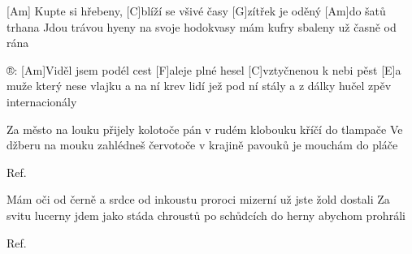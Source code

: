 
[Am] Kupte si hřebeny, [C]blíží se všivé časy	
[G]zítřek je oděný [Am]do šatů trhana
Jdou trávou hyeny na svoje hodokvasy
mám kufry sbaleny už časně od rána

®:	[Am]Viděl jsem podél cest [F]aleje plné hesel	
[C]vztyčnenou k nebi pěst [E]a muže který nese	
vlajku a na ní krev lidí jež pod ní stály
a z dálky hučel zpěv internacionály

Za město na louku přijely kolotoče
pán v rudém klobouku kříčí do tlampače
Ve džberu na mouku zahlédneš červotoče
v krajině pavouků je mouchám do pláče

Ref.

Mám oči od černě a srdce od inkoustu
proroci mizerní už jste žold dostali
Za svitu lucerny jdem jako stáda chroustů
po schůdcích do herny abychom prohráli 

Ref.